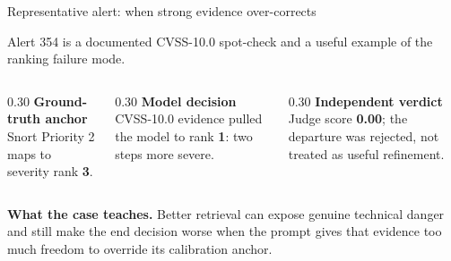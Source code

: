 \documentclass[aspectratio=169,11pt]{beamer}
\newcommand{\lede}[1]{{\color{soft}\small #1\par\medskip}}
\begin{document}
\begin{frame}{Representative alert: when strong evidence over-corrects}
  \lede{Alert 354 is a documented CVSS-10.0 spot-check and a useful example of the ranking failure mode.}
  \begin{columns}[T,onlytextwidth]
    \begin{column}{0.30\textwidth}
      \textbf{\color{accent}Ground-truth anchor}\\[0.35em]
      {\small Snort Priority 2 maps to severity rank \textbf{3}.}
    \end{column}
    \begin{column}{0.30\textwidth}
      \textbf{\color{accent}Model decision}\\[0.35em]
      {\small CVSS-10.0 evidence pulled the model to rank \textbf{1}: two steps more severe.}
    \end{column}
    \begin{column}{0.30\textwidth}
      \textbf{\color{accent}Independent verdict}\\[0.35em]
      {\small Judge score \textbf{0.00}; the departure was rejected, not treated as useful refinement.}
    \end{column}
  \end{columns}
  \vspace{1.2em}
  \noindent\colorbox{accenttint}{%
    \begin{minipage}{\dimexpr\textwidth-2\fboxsep-2\fboxrule\relax}
      \vspace{5pt}
      \small\color{ink}
      \textbf{What the case teaches.} Better retrieval can expose genuine technical danger
      and still make the end decision worse when the prompt gives that evidence too much
      freedom to override its calibration anchor.
      \vspace{5pt}
    \end{minipage}}
\end{frame}
\end{document}
